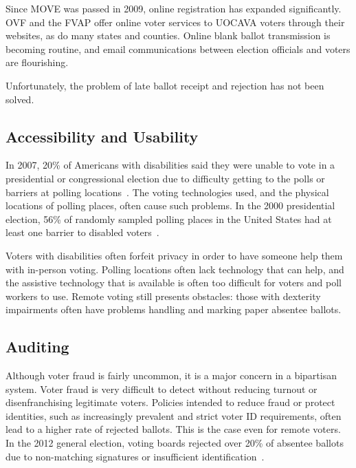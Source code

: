 Since MOVE was passed in 2009, online registration has expanded
significantly. OVF and the FVAP offer online voter services to UOCAVA
voters through their websites, as do many states and counties. Online
blank ballot transmission is becoming routine, and email
communications between election officials and voters are flourishing.

Unfortunately, the problem of late ballot receipt and rejection has
not been solved.


\subsection{Accessibility and Usability}

In 2007, 20\% of Americans with disabilities said they were unable to
vote in a presidential or congressional election due to difficulty
getting to the polls or barriers at polling
locations~\cite{runyan2007improving}. The voting technologies used,
and the physical locations of polling places, often cause such
problems. In the 2000 presidential election, 56\% of randomly sampled
polling places in the United States had at least one barrier to
disabled voters~\cite{united2001voters}.

Voters with disabilities often forfeit privacy in order to have
someone help them with in-person voting. Polling locations often lack
technology that can help, and the assistive technology that is
available is often too difficult for voters and poll workers to
use. Remote voting still presents obstacles: those with dexterity
impairments often have problems handling and marking paper absentee
ballots.

\subsection{Auditing}

Although voter fraud is fairly uncommon, it is a major concern in a
bipartisan system. Voter fraud is very difficult to detect without
reducing turnout or disenfranchising legitimate voters. Policies
intended to reduce fraud or protect identities, such as increasingly
prevalent and strict voter ID requirements, often lead to a higher
rate of rejected ballots. This is the case even for remote voters. In
the 2012 general election, voting boards rejected over 20\% of
absentee ballots due to non-matching signatures or insufficient
identification~\cite{eac2012survey}.

